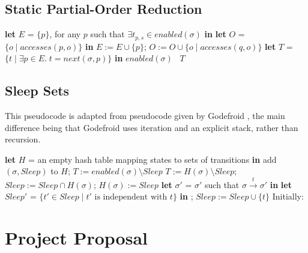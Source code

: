 \documentclass[12pt,a4paper,twoside,openany]{report}
\newcommand{\Let}[2]{\State \textbf{let} #1 = #2 \textbf{in}}
\begin{document}
\section{Static Partial-Order Reduction}
\label{sapp:spor-code}
\begin{algorithmic}[1]
	\Let{$E$}{$\{p\}$,
		for any $p$ such that
		$\exists t_{p,s} \in \textit{enabled}(\sigma)$}
	\Let{$O$}{$\{o \mid \textit{accesses}(p, o)\}$}
	\State $E := E \cup \{p\}$;
	\State $O := O \cup \{o \mid
	\textit{accesses}(q, o)\}$
	\EndIf
	\EndFor
	\EndWhile
	\Let{$T$}{$\{t \mid \exists p \in E.\;
		t = \textit{next}(\sigma,p)\}$}
	\Return $\textit{enabled}(\sigma)$
	\Else \ \Return $T$
	\EndIf
	\EndProcedure
\end{algorithmic}
\vspace{1.5cm}
\section{Sleep Sets}
\label{sapp:sleep-code}

This pseudocode is adapted from pseudocode
given by Godefroid \cite{god96}, the main
difference being that Godefroid uses
iteration and an explicit stack, rather
than recursion.
\smallskip
\begin{algorithmic}[1]
	\Let{$H$}{an empty hash table mapping
		states to sets of transitions}
	\State
	\State add $(\sigma, \textit{Sleep})$ to $H$;
	\State$T := \textit{enabled}(\sigma)
	\setminus \textit{Sleep}$
	\Else
	\State$T := H(\sigma) \setminus
	\textit{Sleep}$;
	\State $\textit{Sleep} := \textit{Sleep}
	\cap H(\sigma)$;
	\State $H(\sigma) := \textit{Sleep}$
	\EndIf
	\Let{$\sigma'$}{$\sigma'$ such that
		$\sigma \xrightarrow{t} \sigma'$}
	\Let{$\textit{Sleep}'$}{$\{t' \in \textit{Sleep}
		\mid t' \text{ is independent with } t\}$}
	\State{};
	\State $\textit{Sleep} := \textit{Sleep} \cup \{t\}$
	\EndFor
	\EndProcedure
	\State
	\State Initially: 
\end{algorithmic}

\chapter{Project Proposal}


\enlargethispage{1\baselineskip}
\end{document}

